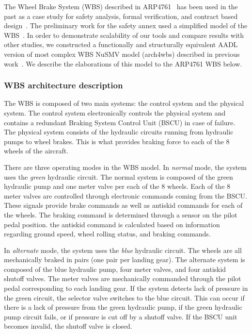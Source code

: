 The Wheel Brake System (WBS) described in ARP4761~\cite{SAE:ARP4761} has been used in the past as a case study for safety analysis, formal verification, and contract based design~\cite{DBLP:conf/cav/BozzanoCPJKPRT15, 10.1007/978-3-319-11936-6-7, CAV2015:BoCiGrMa, Stewart17:IMBSA, propBasedProofSys, Joshi05:SafeComp, NasaRep:MBSA-Aug05}. The preliminary work for the safety annex used a simplified model of the WBS~\cite{Stewart17:IMBSA}. In order to demonstrate scalability of our tools and compare results with other studies, we constructed a functionally and structurally equivalent AADL version of most complex WBS NuSMV model (arch4wbs) described in previous work~\cite{DBLP:conf/cav/BozzanoCPJKPRT15}.  %
We describe the elaborations of this model to the ARP4761 WBS below.

\subsubsection{WBS architecture description}
The WBS is composed of two main systems: the control system and the physical system. The control system electronically controls the physical system and contains a redundant Braking System Control Unit (BSCU) in case of failure. The physical system consists of the hydraulic circuits running from hydraulic pumps to wheel brakes. This is what provides braking force to each of the 8 wheels of the aircraft.

There are three operating modes in the WBS model. In \textit{normal} mode, the system uses the \textit{green} hydraulic circuit. The normal system is composed of the green hydraulic pump and one meter valve per each of the 8 wheels. Each of the 8 meter valves are controlled through electronic commands coming from the BSCU. These signals provide brake commands as well as antiskid commands for each of the wheels. The braking command is determined through a sensor on the pilot pedal position. the antiskid command is calculated based on information regarding ground speed, wheel rolling status, and braking commands.

In \textit{alternate} mode, the system uses the \textit{blue} hydraulic circuit.  The wheels are all mechanically braked in pairs (one pair per landing gear). The alternate system is composed of the blue hydraulic pump, four meter valves, and four antiskid shutoff valves. The meter valves are mechanically commanded through the pilot pedal corresponding to each landing gear. If the system detects lack of pressure in the green circuit, the selector valve switches to the blue circuit. This can occur if there is a lack of pressure from the green hydraulic pump, if the green hydraulic pump circuit fails, or if pressure is cut off by a shutoff valve. If the BSCU unit becomes invalid, the shutoff valve is closed.

